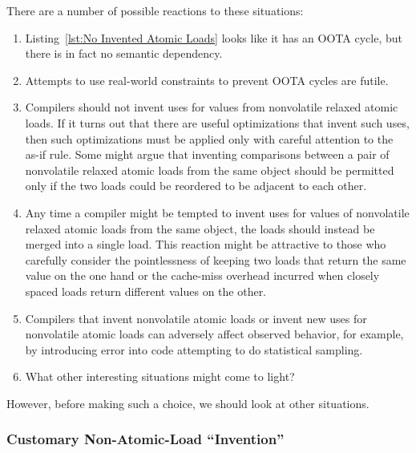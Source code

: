 \documentclass[10]{article}
\begin{document}
There are a number of possible reactions to these situations:

\begin{enumerate}
\item	Listing~\ref{lst:No Invented Atomic Loads}
	looks like it has an OOTA cycle, but there is in fact no
	semantic dependency.
\item	Attempts to use real-world constraints to prevent OOTA cycles
	are futile.
\item	Compilers should not invent uses for values from
	nonvolatile relaxed atomic loads.
	If it turns out that there are useful optimizations that invent
	such uses, then such optimizations must be applied only with
	careful attention to the as-if rule.
	Some might argue that inventing comparisons between a pair of
	nonvolatile relaxed atomic loads from the same object should
	be permitted only if the two loads could be reordered to be
	adjacent to each other.
\item	Any time a compiler might be tempted to invent uses for
	values of nonvolatile relaxed atomic loads from the same
	object, the loads should instead be merged into a single load.
	This reaction might be attractive to those who carefully consider
	the pointlessness of keeping two loads that return the same value
	on the one hand or the cache-miss overhead incurred when closely
	spaced loads return different values on the other.
\item	Compilers that invent nonvolatile atomic loads or invent
	new uses for nonvolatile atomic loads can adversely affect
	observed behavior, for example, by introducing error into code
	attempting to do statistical sampling.
\item	What other interesting situations might come to light?
\end{enumerate}

However, before making such a choice, we should look at other situations.

\subsubsection{Customary Non-Atomic-Load ``Invention''}
\label{app:Customary Non-Atomic-Load Invention}
\end{document}
